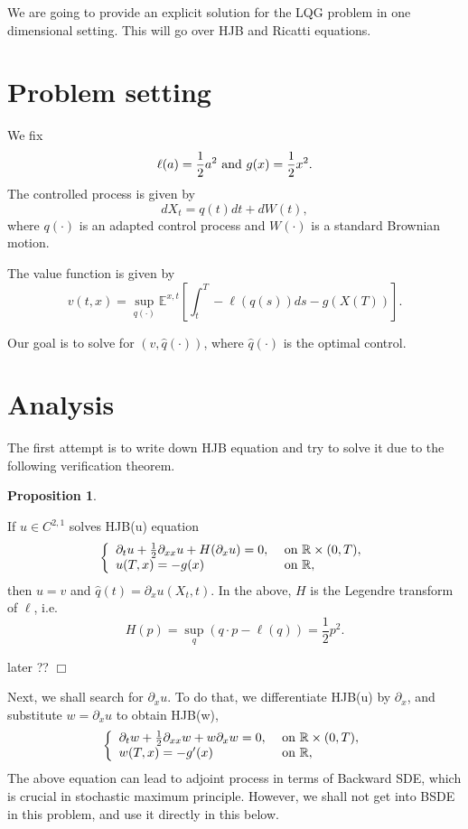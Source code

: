 \documentclass{article}
\def\more{}
\newtheorem{proposition}[theorem]{Proposition}
\newenvironment{proof}{\noindent {\sc Proof:}}{$\Box$} %
\begin{document}
We are going to provide an explicit solution for the LQG problem 
in one dimensional setting. This will go over HJB and Ricatti equations.

\more

\section {Problem setting}
We fix 
$$\ell (a)  = \frac 1 2 a^{2} \hbox{ and } g(x) = \frac 1 2 x^{2}.$$
The controlled process is given by
$$d X_{t} = q(t) dt + dW(t),$$
where $q(\cdot)$ is an adapted control process 
and $W(\cdot)$ is a standard Brownian motion.

The value function is given by
$$v(t, x) = \sup_{q(\cdot)} \mathbb E^{x, t} 
[ \int_{t}^{T} - \ell (q(s)) ds - g(X(T))].$$



Our goal is to solve for $(v, \hat q(\cdot))$, where $\hat q(\cdot)$ is the optimal control.

\section{Analysis}
The first attempt is to write down HJB equation and try to solve it due
to the following verification theorem.
\begin{proposition}
 \label{p:170810-01}
\end{proposition}
If $u \in C^{2,1}$ solves HJB(u) equation
$$  \left\{
\begin{array}
 {ll}
 \partial_{t} u + \frac 1 2 \partial_{xx} u + H(\partial_{x} u)= 0, &
 \hbox{ on } 
\mathbb R\times (0, T), 
\\
u(T, x) = - g(x) &
\hbox{ on } \mathbb R,
\end{array} \right .
$$
then $u = v$ and $\hat q(t) = \partial_{x} u (X_{t}, t)$. In the above, $H$ is
the Legendre transform of $\ell$, i.e. 
$$H(p) = \sup_{q} (q \cdot p - \ell(q)) = \frac 1 2 p^{2}.$$

\begin{proof}
 later ??
\end{proof}

Next, we shall search for $\partial_{x} u$. To do that, we differentiate 
HJB(u) by $\partial_{x}$, 
and substitute $w = \partial_{x} u$ to obtain HJB(w), 
$$ \left\{
\begin{array}
 {ll}
 \partial_{t} w + \frac 1 2 \partial_{xx} w + w \partial_{x}w = 0,  
 &\hbox{ on } 
\mathbb R\times (0, T), 
\\
w(T, x) = - g'(x) &\hbox{ on } \mathbb R,
\end{array}
\right.
$$
The above equation can lead to adjoint process in terms of Backward SDE, 
which is crucial in stochastic maximum principle. 
However, we shall not get into BSDE in this problem, and use it directly in
this below.
\end{document}
